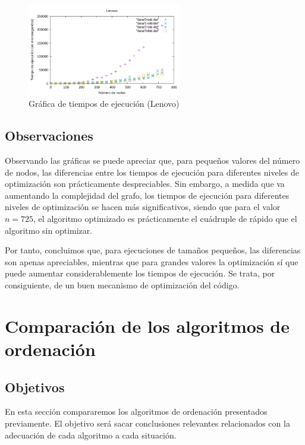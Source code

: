 \documentclass{homework}
\begin{document}
    \begin{figure}[H]
        \centering
        \includegraphics[width=0.6\textwidth]{../data/lenovo-opt.pdf}
        \caption{Gráfica de tiempos de ejecución (Lenovo)}
    \end{figure}

    \subsection{Observaciones}

    Observando las gráficas se puede apreciar que, para pequeños valores del número de nodos, las diferencias entre los
    tiempos de ejecución para diferentes niveles de optimización son prácticamente despreciables. Sin embargo, a medida
    que va aumentando la complejidad del grafo, los tiempos de ejecución para diferentes niveles de optimización se hacen
    más significativos, siendo que para el valor $n=725$, el algoritmo optimizado es prácticamente el cuádruple de rápido que
    el algoritmo sin optimizar. 

    Por tanto, concluimos que, para ejecuciones de tamaños pequeños, las diferencias son apenas apreciables, mientras que
    para grandes valores la optimización sí que puede aumentar considerablemente los tiempos de ejecución. Se trata, por
    consiguiente, de un buen mecanismo de optimización del código. 


    \section{Comparación de los algoritmos de ordenación}

    \subsection{Objetivos}

    En esta sección compararemos los algoritmos de ordenación presentados previamente. El objetivo será
    sacar conclusiones relevantes relacionados con la adecuación de cada algoritmo a cada situación. 
\end{document}
